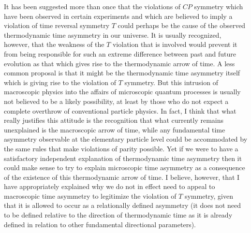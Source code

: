 \documentclass[notitlepage,12pt]{report}
\begin{document}
It has been suggested more than once that the violations of $CP$ symmetry which have been observed in certain experiments and which are believed to imply a violation of time reversal symmetry $T$ could perhaps be the cause of the observed thermodynamic time asymmetry in our universe. It is usually recognized, however, that the weakness of the $T$ violation that is involved would prevent it from being responsible for such an extreme difference between past and future evolution as that which gives rise to the thermodynamic arrow of time. A less common proposal is that it might be the thermodynamic time asymmetry itself which is giving rise to the violation of $T$ symmetry. But this intrusion of macroscopic physics into the affairs of microscopic quantum processes is usually not believed to be a likely possibility, at least by those who do not expect a complete overthrow of conventional particle physics. In fact, I think that what really justifies this attitude is the recognition that what currently remains unexplained is the macroscopic arrow of time, while any fundamental time asymmetry observable at the elementary particle level could be accommodated by the same rules that make violations of parity possible. Yet if we were to have a satisfactory independent explanation of thermodynamic time asymmetry then it could make sense to try to explain microscopic time asymmetry as a consequence of the existence of this thermodynamic arrow of time. I believe, however, that I have appropriately explained why we do not in effect need to appeal to macroscopic time asymmetry to legitimize the violation of $T$ symmetry, given that it is allowed to occur as a relationally defined asymmetry (it does not need to be defined relative to the direction of thermodynamic time as it is already defined in relation to other fundamental directional parameters).
\end{document}
